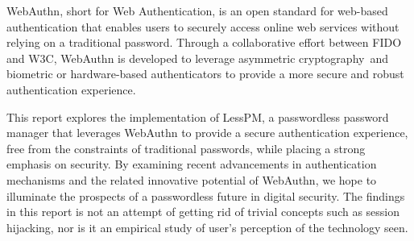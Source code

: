 WebAuthn, short for Web Authentication, is an open standard for web-based
authentication that enables users to securely access online web services without
relying on a traditional password.
Through a collaborative effort between FIDO and W3C, WebAuthn is developed to
leverage asymmetric cryptography\assymetricCrypto\jsonwebLibrary~and biometric
or hardware-based authenticators to provide a more secure and robust
authentication experience.

This report explores the implementation of LessPM, a passwordless password
manager that leverages WebAuthn to provide a secure authentication experience,
free from the constraints of traditional passwords, while placing a strong
emphasis on security.
By examining recent advancements in authentication mechanisms and the related
innovative potential of WebAuthn, we hope to illuminate the prospects of a
passwordless future in digital security.
The findings in this report is not an attempt of getting rid of trivial
concepts such as session hijacking, nor is it an empirical study of user's
perception of the technology seen.